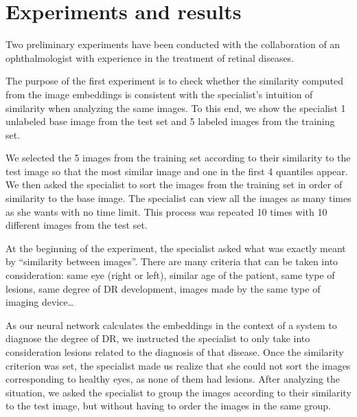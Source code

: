 %
\section{Experiments and results}
\label{sec:experiments}
%

Two preliminary experiments have been conducted with the collaboration of an ophthalmologist with experience in the treatment of retinal diseases. 

The purpose of the first experiment is to check whether the similarity computed from the image embeddings is consistent with the specialist's intuition of similarity when analyzing the same images. To this end, we show the specialist 1 unlabeled base image from the test set and 5 labeled images from the training set. 

We selected the 5 images from the training set according to their similarity to the test image so that the most similar image and one in the first 4 quantiles  appear. We then asked the specialist to sort the images from the training set in order of similarity to the base image. The specialist can view all the images as many times as she wants with no time limit. This process was repeated 10 times with 10 different images from the test set. 

At the beginning of the experiment, the specialist asked what was exactly meant by ``similarity between images''. There are many criteria that can be taken into consideration: same eye (right or left), similar age of the patient, same type of lesions, same degree of DR development, images made by the same type of imaging device… 

As our neural network calculates the embeddings in the context of a system to diagnose the degree of DR, we instructed the specialist to only take into consideration lesions related to the diagnosis of that disease. Once the similarity criterion was set, the specialist made us realize that she could not sort the images corresponding to healthy eyes, as none of them had lesions. After analyzing the situation, we asked the specialist to group the images according to their similarity to the test image, but without having to order the images in the same group.

